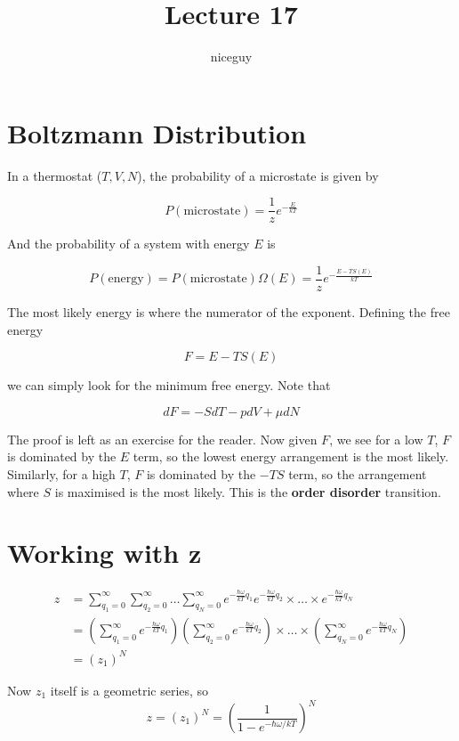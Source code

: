 \documentclass[12pt]{article}
\author{niceguy}
\title{Lecture 17}
\begin{document}
\maketitle

\section{Boltzmann Distribution}

In a thermostat ($T,V,N$), the probability of a microstate is given by

$$P(\text{microstate}) = \frac{1}{z} e^{-\frac{E}{kT}}$$

And the probability of a system with energy $E$ is

$$P(\text{energy}) = P(\text{microstate})\Omega(E) = \frac{1}{z} e^{-\frac{E-TS(E)}{kT}}$$

The most likely energy is where the numerator of the exponent. Defining the free energy

$$F = E-TS(E)$$

we can simply look for the minimum free energy. Note that

$$dF = -SdT - pdV + \mu dN$$

The proof is left as an exercise for the reader. Now given $F$, we see for a low $T$, $F$ is dominated by the $E$ term, so the lowest energy arrangement is the most likely. Similarly, for a high $T$, $F$ is dominated by the $-TS$ term, so the arrangement where $S$ is maximised is the most likely. This is the \textbf{order disorder} transition.

\section{Working with z}

\begin{align*}
    z &= \sum_{q_1=0}^\infty \sum_{q_2=0}^\infty \dots \sum_{q_N=0}^\infty e^{-\frac{\hbar\omega}{kT}q_1} e^{-\frac{\hbar\omega}{kT}q_2} \times \dots \times e^{-\frac{\hbar\omega}{kT}q_N} \\
      &= \left(\sum_{q_1=0}^\infty e^{-\frac{\hbar\omega}{kT}q_1}\right)\left(\sum_{q_2=0}^\infty e^{-\frac{\hbar\omega}{kT}q_2}\right)\times\dots\times\left(\sum_{q_N=0}^\infty e^{-\frac{\hbar\omega}{kT}q_N}\right) \\
      &= (z_1)^N
\end{align*}

Now $z_1$ itself is a geometric series, so
$$z = (z_1)^N = \left(\frac{1}{1-e^{-\hbar\omega/kT}}\right)^N$$
\end{document}

